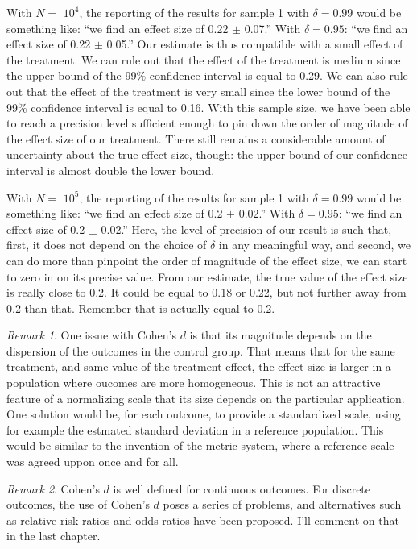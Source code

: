 \documentclass[
]{book}
\theoremstyle{definition}
\theoremstyle{definition}
\theoremstyle{definition}
\theoremstyle{definition}
\theoremstyle{remark}
\newtheorem*{remark}{Remark}
\begin{document}
With \(N=\) \ensuremath{10^{4}}, the reporting of the results for sample 1 with \(\delta=0.99\) would be something like: ``we find an effect size of 0.22 \(\pm\) 0.07.''
With \(\delta=0.95\): ``we find an effect size of 0.22 \(\pm\) 0.05.''
Our estimate is thus compatible with a small effect of the treatment.
We can rule out that the effect of the treatment is medium since the upper bound of the 99\% confidence interval is equal to 0.29.
We can also rule out that the effect of the treatment is very small since the lower bound of the 99\% confidence interval is equal to 0.16.
With this sample size, we have been able to reach a precision level sufficient enough to pin down the order of magnitude of the effect size of our treatment.
There still remains a considerable amount of uncertainty about the true effect size, though: the upper bound of our confidence interval is almost double the lower bound.

With \(N=\) \ensuremath{10^{5}}, the reporting of the results for sample 1 with \(\delta=0.99\) would be something like: ``we find an effect size of 0.2 \(\pm\) 0.02.''
With \(\delta=0.95\): ``we find an effect size of 0.2 \(\pm\) 0.02.''
Here, the level of precision of our result is such that, first, it does not depend on the choice of \(\delta\) in any meaningful way, and second, we can do more than pinpoint the order of magnitude of the effect size, we can start to zero in on its precise value.
From our estimate, the true value of the effect size is really close to 0.2.
It could be equal to 0.18 or 0.22, but not further away from 0.2 than that.
Remember that is actually equal to 0.2.

\begin{remark}
\iffalse{} {Remark. } \fi{}One issue with Cohen's \(d\) is that its magnitude depends on the dispersion of the outcomes in the control group.
That means that for the same treatment, and same value of the treatment effect, the effect size is larger in a population where oucomes are more homogeneous.
This is not an attractive feature of a normalizing scale that its size depends on the particular application.
One solution would be, for each outcome, to provide a standardized scale, using for example the estmated standard deviation in a reference population.
This would be similar to the invention of the metric system, where a reference scale was agreed uppon once and for all.
\end{remark}

\begin{remark}
\iffalse{} {Remark. } \fi{}Cohen's \(d\) is well defined for continuous outcomes.
For discrete outcomes, the use of Cohen's \(d\) poses a series of problems, and alternatives such as relative risk ratios and odds ratios have been proposed.
I'll comment on that in the last chapter.
\end{remark}
\end{document}
